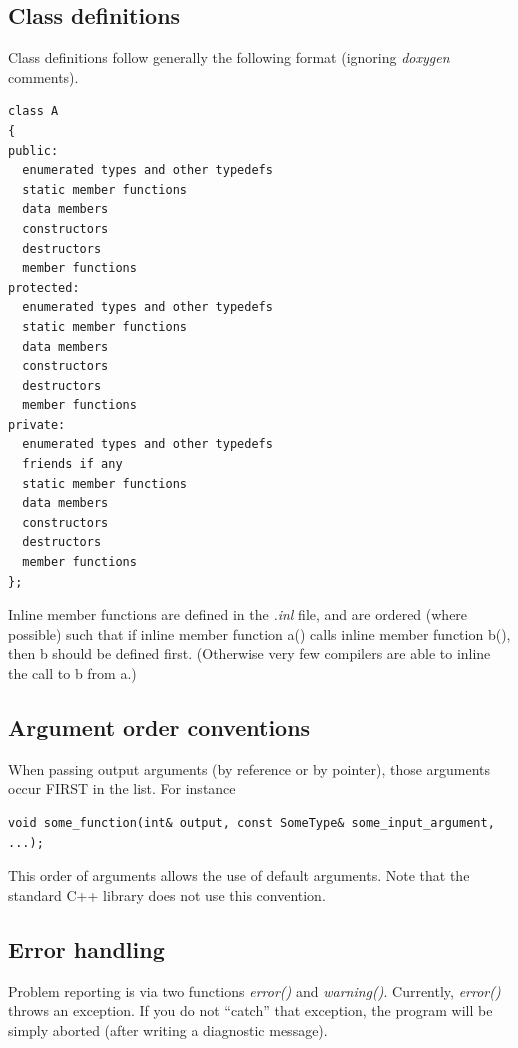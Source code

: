 \documentclass{article}
\begin{document}
\subsection{
Class definitions}

Class definitions follow generally the following format (ignoring \textit{doxygen} 
comments).

\begin{verbatim}
class A
{
public: 
  enumerated types and other typedefs 
  static member functions  
  data members  
  constructors 
  destructors 
  member functions
protected: 
  enumerated types and other typedefs 
  static member functions 
  data members 
  constructors 
  destructors 
  member functions
private: 
  enumerated types and other typedefs 
  friends if any 
  static member functions 
  data members 
  constructors 
  destructors 
  member functions
};
\end{verbatim}


Inline member functions are defined in the \textit{.inl} file, and 
are ordered (where possible) such that if inline member function 
a() calls inline member function b(), 
then b should be defined first. (Otherwise very 
few compilers are able to inline the call to b 
from a.)



\subsection{
Argument order conventions}

When passing output arguments (by reference or by pointer), those 
arguments occur FIRST in the list. For instance
\begin{verbatim}
void some_function(int& output, const SomeType& some_input_argument, ...);
\end{verbatim}


This order of arguments allows the use of default arguments. 
Note that the standard C++ library does not use this convention.

\subsection{
Error handling }

Problem reporting is via two functions \textit{error()} and \textit{warning()}. 
Currently, \textit{error()} throws an exception. If you do not ``catch'' that
exception, the program will be simply aborted (after writing 
a diagnostic message). 
\end{document}
